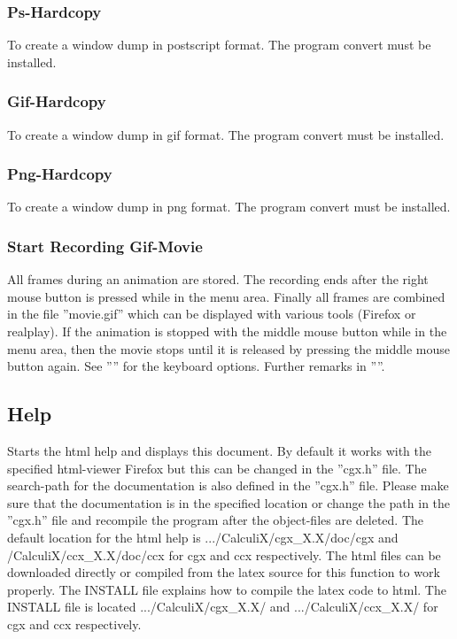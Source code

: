 \documentclass{article}
\begin{document}
\subsubsection{\label{Ps-Hardcopy}Ps-Hardcopy}
To create a window dump in postscript format. The program convert must be installed.

\subsubsection{\label{Gif-Hardcopy}Gif-Hardcopy}
To create a window dump in gif format. The program convert must be installed.

\subsubsection{\label{Png-Hardcopy}Png-Hardcopy}
To create a window dump in png format. The program convert must be installed.

\subsubsection{\label{Start Recording Gif-Movie}Start Recording Gif-Movie}
All frames during an animation are stored. The recording ends after the right mouse button is pressed while in the menu area. Finally all frames are combined in the file ''movie.gif'' which can be displayed with various tools (Firefox \cite{Firefox} or realplay). If the animation is stopped with the middle mouse button while in the menu area, then the movie stops until it is released by pressing the middle mouse button again. See '''' for the keyboard options. Further remarks in ''''.

\subsection{\label{Help}Help}
Starts the html help and displays this document. By default it works with the specified html-viewer Firefox \cite{Firefox} but this can be changed in the ''cgx.h'' file. The search-path for the documentation is also defined in the ''cgx.h'' file. Please make sure that the documentation is in the specified location or change the path in the ''cgx.h'' file and recompile the program after the object-files are deleted.  The default location for the html help is .../CalculiX/cgx\_X.X/doc/cgx and /CalculiX/ccx\_X.X/doc/ccx for cgx and ccx respectively.  The html files can be downloaded directly or compiled from the latex source for this function to work properly. The INSTALL file explains how to compile the latex code to html.  The INSTALL file is located .../CalculiX/cgx\_X.X/ and .../CalculiX/ccx\_X.X/ for cgx and ccx respectively.
\end{document}
